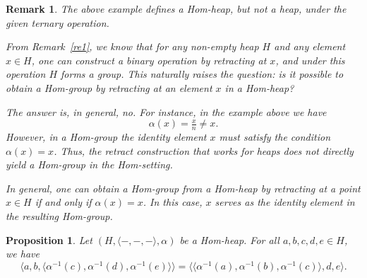 \documentclass[14pt]{article}
\newtheorem{prop}[thm]{Proposition}
\theoremstyle{Definition}
\newtheorem{Rem}[thm]{Remark}
\theoremstyle{remark}
\begin{document}
\begin{Rem}
The above example defines a Hom-heap, but not a heap, under the given ternary operation.


From Remark~\ref{re1}, we know that for any non-empty heap $H$ and any element $x \in H$, one can construct a binary operation by retracting at $x$, and under this operation $H$ forms a group.  
This naturally raises the question: is it possible to obtain a Hom-group by retracting at an element $x$ in a Hom-heap?

The answer is, in general, \emph{no}. For instance, in the example above we have  
\[
\alpha(x) = \tfrac{x}{n} \neq x.
\]  
However, in a Hom-group the identity element $x$ must satisfy the condition $\alpha(x) = x$.  
Thus, the retract construction that works for heaps does not directly yield a Hom-group in the Hom-setting.

In general, one can obtain a Hom-group from a Hom-heap by retracting at a point $x \in H$ \emph{if and only if} $\alpha(x) = x$.  
In this case, $x$ serves as the identity element in the resulting Hom-group.
\end{Rem}
\begin{prop}\label{Prop1}
Let $(H, \langle -,-,- \rangle, \alpha)$ be a Hom-heap. For all $a,b,c,d,e \in H$, we have
\[
\langle a, b, \langle \alpha^{-1}(c), \alpha^{-1}(d), \alpha^{-1}(e) \rangle \rangle 
= \langle \langle \alpha^{-1}(a), \alpha^{-1}(b), \alpha^{-1}(c) \rangle, d, e \rangle.
\]
\end{prop}
\end{document}
